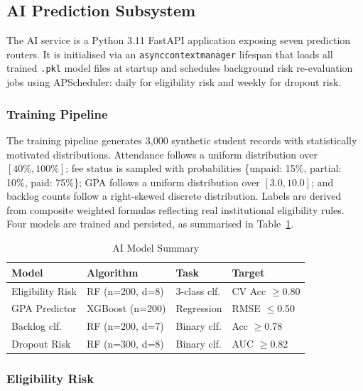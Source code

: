 \documentclass[conference]{IEEEtran}
\begin{document}
\subsection{AI Prediction Subsystem}

The AI service is a Python 3.11 FastAPI \cite{fastapi} application exposing
seven prediction routers. It is initialised via an \texttt{asynccontextmanager}
lifespan that loads all trained \texttt{.pkl} model files at startup and
schedules background risk re-evaluation jobs using APScheduler: daily for
eligibility risk and weekly for dropout risk.

\subsubsection{Training Pipeline}

The training pipeline generates 3,000 synthetic student records with
statistically motivated distributions. Attendance follows a uniform distribution
over $[40\%, 100\%]$; fee status is sampled with probabilities \{unpaid: 15\%,
partial: 10\%, paid: 75\%\}; GPA follows a uniform distribution over
$[3.0, 10.0]$; and backlog counts follow a right-skewed discrete distribution.
Labels are derived from composite weighted formulas reflecting real institutional
eligibility rules. Four models are trained and persisted, as summarised in
Table~\ref{tab:models}.

\begin{table}[htbp]
\caption{AI Model Summary}
\label{tab:models}
\centering
\begin{tabular}{p{1.9cm} p{1.7cm} p{1.5cm} p{1.4cm}}
\toprule
\textbf{Model} & \textbf{Algorithm} & \textbf{Task} & \textbf{Target} \\
\midrule
Eligibility Risk & RF (n=200, d=8) & 3-class clf. & CV Acc $\geq$0.80 \\
GPA Predictor    & XGBoost (n=200) & Regression   & RMSE $\leq$0.50  \\
Backlog clf.     & RF (n=200, d=7) & Binary clf.  & Acc $\geq$0.78   \\
Dropout Risk     & RF (n=300, d=8) & Binary clf.  & AUC $\geq$0.82   \\
\bottomrule
\end{tabular}
\end{table}

\subsubsection{Eligibility Risk}
\end{document}
